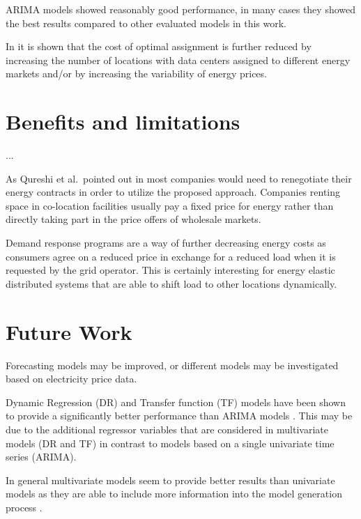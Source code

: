




ARIMA models showed reasonably good performance, in many cases they showed the best results compared to other evaluated models in this work. 







In \cite{de2013study} it is shown that the cost of optimal assignment is further reduced by increasing the number of locations with data centers assigned to different energy markets and/or by increasing the variability of energy prices. 


\section{Benefits and limitations}



...

As Qureshi et al.~pointed out in \cite{qureshi2009cutting} most companies would need to renegotiate their energy contracts in order to utilize the proposed approach. Companies renting space in co-location facilities usually pay a fixed price for energy rather than directly taking part in the price offers of wholesale markets. 

Demand response programs are a way of further decreasing energy costs as consumers agree on a reduced price in exchange for a reduced load when it is requested by the grid operator\cite{albadi2008summary}. This is certainly interesting for energy elastic distributed systems that are able to shift load to other locations dynamically. 






\section{Future Work}


Forecasting models may be improved, or different models may be investigated based on electricity price data. 

Dynamic Regression (DR) and Transfer function (TF) models have been shown to provide a significantly better performance than ARIMA models \cite{aggarwal2009electricity,weron2005forecasting}. This may be due to the additional regressor variables that are considered in multivariate models (DR and TF) in contrast to models based on a single univariate time series (ARIMA). 

In general multivariate models seem to provide better results than univariate models as they are able to include more information into the model generation process \cite{weron2005forecasting}. 

